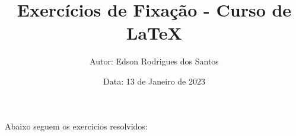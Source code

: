 \documentclass[a4paper, 12pt]{article}
\title{\textbf{Exercícios de Fixação - Curso de LaTeX}}
\author{Autor: Edson Rodrigues dos Santos}
\date{Data: 13 de Janeiro de 2023}
\begin{document}
\maketitle

Abaixo seguem os exercicios resolvidos:
\end{document}
